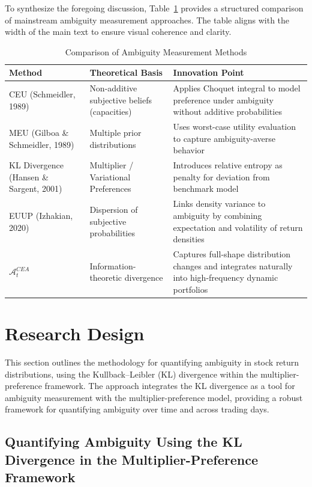 \documentclass[preprint,12pt,authoryear]{elsarticle}
\begin{document}
To synthesize the foregoing discussion, Table~\ref{tab:ambiguity_methods} provides a structured comparison of mainstream ambiguity measurement approaches. The table aligns with the width of the main text to ensure visual coherence and clarity.
\begin{table}[H]
  \centering
  \caption{Comparison of Ambiguity Measurement Methods}
  \label{tab:ambiguity_methods}
  \renewcommand{\arraystretch}{1.3}
  \begin{tabularx}{\linewidth}{>{\raggedright\arraybackslash}X >{\raggedright\arraybackslash}X p{}}
    \toprule
    \textbf{Method} & \textbf{Theoretical Basis} & \textbf{Innovation Point} \\
    \midrule
    CEU (Schmeidler, 1989) & Non-additive subjective beliefs (capacities) & Applies Choquet integral to model preference under ambiguity without additive probabilities \\
    MEU (Gilboa \& Schmeidler, 1989) & Multiple prior distributions & Uses worst-case utility evaluation to capture ambiguity-averse behavior \\
    KL Divergence (Hansen \& Sargent, 2001) & Multiplier / Variational Preferences & Introduces relative entropy as penalty for deviation from benchmark model \\
    EUUP (Izhakian, 2020) & Dispersion of subjective probabilities & Links density variance to ambiguity by combining expectation and volatility of return densities \\
    \textbf{$\mathcal{A}^{CEA}_t$} & Information-theoretic divergence & Captures full-shape distribution changes and integrates naturally into high-frequency dynamic portfolios \\
    \bottomrule
  \end{tabularx}
\end{table}


\section{Research Design}
This section outlines the methodology for quantifying ambiguity in stock return distributions, using the Kullback–Leibler (KL) divergence within the multiplier-preference framework. The approach integrates the KL divergence as a tool for ambiguity measurement with the multiplier-preference model, providing a robust framework for quantifying ambiguity over time and across trading days.

\subsection{Quantifying Ambiguity Using the KL Divergence in the Multiplier-Preference Framework}
\end{document}
